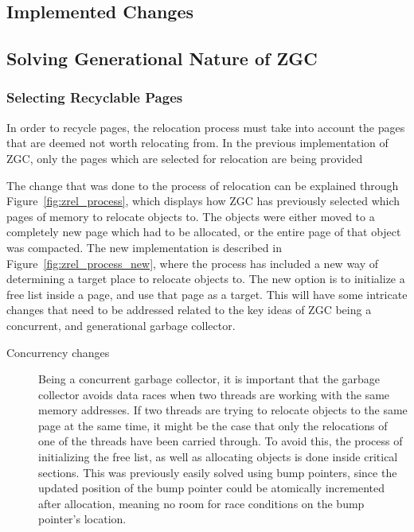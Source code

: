 \subsection{Implemented Changes}




\subsection{Solving Generational Nature of ZGC}
\subsubsection{Selecting Recyclable Pages}
In order to recycle pages, the relocation process must take into account the pages that are deemed not worth relocating from. In the previous implementation of ZGC, only the pages which are selected for relocation are being provided

The change that was done to the process of relocation can be explained through Figure~\ref{fig:zrel_process}, which displays how ZGC has previously selected which pages of memory to relocate objects to. The objects were either moved to a completely new page which had to be allocated, or the entire page of that object was compacted. The new implementation is described in Figure~\ref*{fig:zrel_process_new}, where the process has included a new way of determining a target place to relocate objects to. The new option is to initialize a free list inside a page, and use that page as a target. This will have some intricate changes that need to be addressed related to the key ideas of ZGC being a concurrent, and generational garbage collector.
\begin{description}
    \item[Concurrency changes] Being a concurrent garbage collector, it is important that the garbage collector avoids data races when two threads are working with the same memory addresses. If two threads are trying to relocate objects to the same page at the same time, it might be the case that only the relocations of one of the threads have been carried through. To avoid this, the process of initializing the free list, as well as allocating objects is done inside critical sections. This was previously easily solved using bump pointers, since the updated position of the bump pointer could be atomically incremented after allocation, meaning no room for race conditions on the bump pointer's location.
\end{description}

